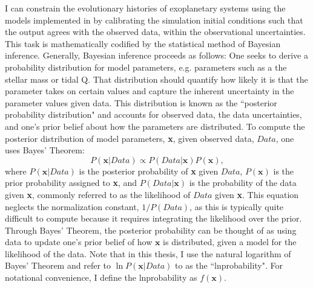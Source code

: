 I can constrain the evolutionary histories of exoplanetary systems using the models implemented in \vplanet by calibrating the simulation initial conditions such that the output agrees with the observed data, within the observational uncertainties.  This task is mathematically codified by the statistical method of Bayesian inference. Generally, Bayesian inference proceeds as follows:  One seeks to derive a probability distribution for model parameters, e.g. \vplanet parameters such as a the stellar mass or tidal Q.  That distribution should quantify how likely it is that the parameter takes on certain values and capture the inherent uncertainty in the parameter values given data.  This distribution is known as the ``posterior probability distribution" and accounts for observed data, the data uncertainties, and one's prior belief about how the parameters are distributed. To compute the posterior distribution of model parameters, \textbf{x}, given observed data, $Data$, one uses Bayes' Theorem: 
\begin{equation} \label{AP:eqn:bayes}
P(\textbf{x} | Data) \propto P(Data | \textbf{x}) P(\textbf{x}),
\end{equation}
where $P(\textbf{x} | Data)$ is the posterior probability of \textbf{x} given $Data$, $P(\textbf{x})$ is the prior probability assigned to \textbf{x}, and $P(Data | \textbf{x})$ is the probability of the data given \textbf{x}, commonly referred to as the likelihood of $Data$ given \textbf{x}. This equation neglects the normalization constant, $1/P(Data)$, as this is typically quite difficult to compute because it requires integrating the likelihood over the prior. Through Bayes' Theorem, the posterior probability can be thought of as using data to update one's prior belief of how $\textbf{x}$ is distributed, given a model for the likelihood of the data. Note that in this thesis, I use the natural logarithm of Bayes' Theorem and refer to $\ln P(\textbf{x} | Data)$ to as the ``lnprobability". For notational convenience, I define the lnprobability as $f(\textbf{x})$. 


